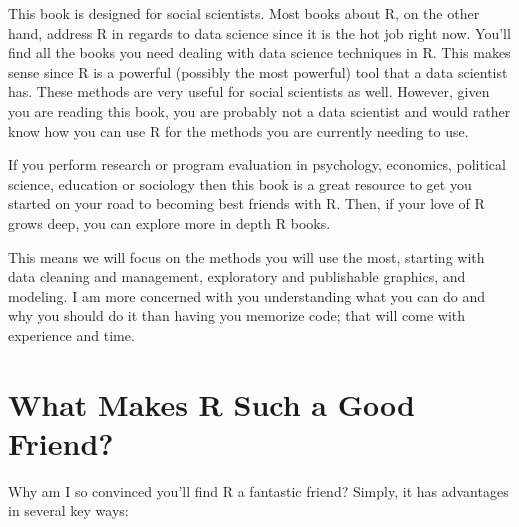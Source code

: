 \documentclass{book}
\begin{document}
This book is designed for social scientists. Most books about R, on the other hand, address R in regards to data science since it is the hot job right now. You'll find all the books you need dealing with data science techniques in R. This makes sense since R is a powerful (possibly the most powerful) tool that a data scientist has. These methods are very useful for social scientists as well. However, given you are reading this book, you are probably not a data scientist and would rather know how you can use R for the methods you are currently needing to use. 

If you perform research or program evaluation in psychology, economics, political science, education or sociology then this book is a great resource to get you started on your road to becoming best friends with R. Then, if your love of R grows deep, you can explore more in depth R books.

This means we will focus on the methods you will use the most, starting with data cleaning and management, exploratory and publishable graphics, and modeling. I am more concerned with you understanding what you can do and why you should do it than having you memorize code; that will come with experience and time.

\section*{What Makes R Such a Good Friend?}

Why am I so convinced you'll find R a fantastic friend? Simply, it has advantages in several key ways:
\end{document}

